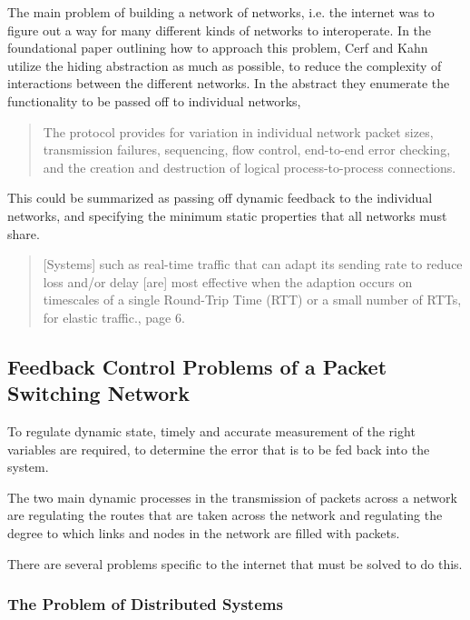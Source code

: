 

The main problem of building a network of networks, i.e. the internet was to figure out a way for
many different kinds of networks to interoperate. In the foundational paper outlining how to
approach this problem\cite{cerf1974}, Cerf and Kahn utilize the hiding abstraction as much as
possible, to reduce the complexity of interactions between the different networks. In the abstract
they enumerate the functionality to be passed off to individual networks, 

\begin{quote}
The protocol provides for variation in individual network packet sizes, transmission failures,
sequencing, flow control, end-to-end error checking, and the creation and destruction of logical
process-to-process connections.
\end{quote}

This could be summarized as passing off dynamic feedback to the individual networks, and specifying
the minimum static properties that all networks must share. 


\begin{quote}
    [Systems] such as real-time traffic that can adapt its sending rate to reduce loss and/or delay
    [are] most effective when the adaption occurs on timescales of a single Round-Trip Time (RTT) or
    a small number of RTTs, for elastic traffic.\cite{rfc7567}, page 6.
\end{quote}

\subsection{Feedback Control Problems of a Packet Switching Network}

To regulate dynamic state, timely and accurate measurement of the right variables are required, to
determine the error that is to be fed back into the system.

The two main dynamic processes in the transmission of packets across a network are regulating the
routes that are taken across the network and regulating the degree to which links and nodes in the
network are filled with packets.

There are several problems specific to the internet that must be solved to do this.

\subsubsection{The Problem of Distributed Systems}


